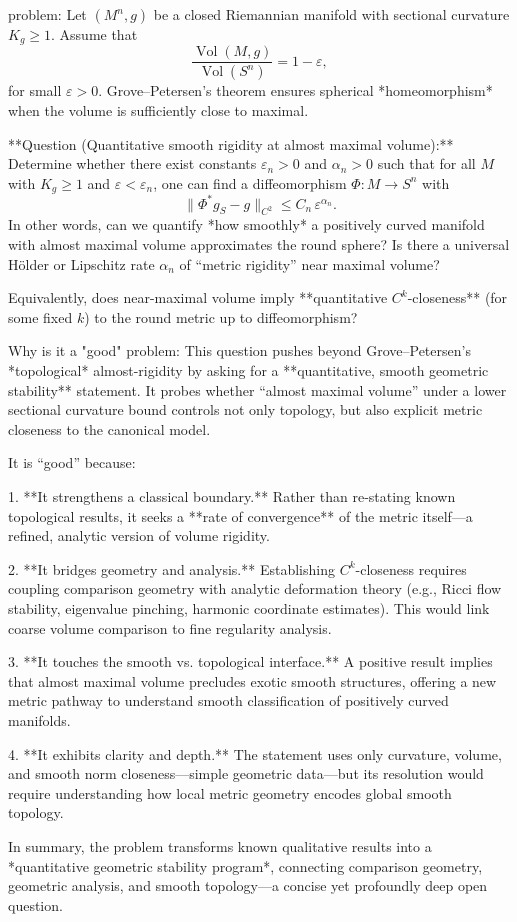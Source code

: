 problem:  
Let \( (M^n,g) \) be a closed Riemannian manifold with sectional curvature \( K_g \ge 1 \).  Assume that  
\[
\frac{\operatorname{Vol}(M,g)}{\operatorname{Vol}(S^n)} = 1 - \varepsilon,
\]
for small \(\varepsilon>0\).  Grove–Petersen’s theorem ensures spherical *homeomorphism* when the volume is sufficiently close to maximal.  

**Question (Quantitative smooth rigidity at almost maximal volume):**  
Determine whether there exist constants \( \varepsilon_n>0 \) and \( \alpha_n>0\) such that for all \( M \) with \( K_g \ge 1 \) and \( \varepsilon < \varepsilon_n \), one can find a diffeomorphism \( \Phi:M\to S^n \) with  
\[
\|\Phi^* g_S - g\|_{C^{2}} \le C_n\, \varepsilon^{\alpha_n}.
\]
In other words, can we quantify *how smoothly* a positively curved manifold with almost maximal volume approximates the round sphere?  Is there a universal Hölder or Lipschitz rate \( \alpha_n \) of “metric rigidity” near maximal volume?  

Equivalently, does near-maximal volume imply **quantitative \(C^k\)-closeness** (for some fixed \(k\)) to the round metric up to diffeomorphism?  

Why is it a "good" problem:  
This question pushes beyond Grove–Petersen’s *topological* almost-rigidity by asking for a **quantitative, smooth geometric stability** statement.  It probes whether “almost maximal volume” under a lower sectional curvature bound controls not only topology, but also explicit metric closeness to the canonical model.  

It is “good” because:  

1. **It strengthens a classical boundary.**  
   Rather than re‑stating known topological results, it seeks a **rate of convergence** of the metric itself—a refined, analytic version of volume rigidity.  

2. **It bridges geometry and analysis.**  
   Establishing \(C^k\)-closeness requires coupling comparison geometry with analytic deformation theory (e.g., Ricci flow stability, eigenvalue pinching, harmonic coordinate estimates).  This would link coarse volume comparison to fine regularity analysis.  

3. **It touches the smooth vs. topological interface.**  
   A positive result implies that almost maximal volume precludes exotic smooth structures, offering a new metric pathway to understand smooth classification of positively curved manifolds.  

4. **It exhibits clarity and depth.**  
   The statement uses only curvature, volume, and smooth norm closeness—simple geometric data—but its resolution would require understanding how local metric geometry encodes global smooth topology.  

In summary, the problem transforms known qualitative results into a *quantitative geometric stability program*, connecting comparison geometry, geometric analysis, and smooth topology—a concise yet profoundly deep open question.